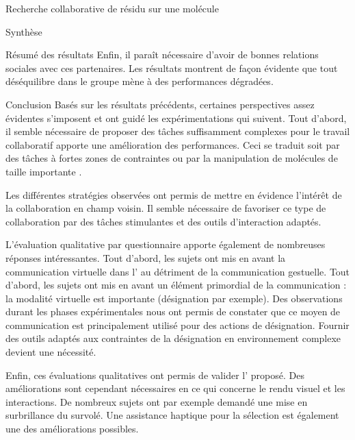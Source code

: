 \documentclass[myfrancais]{mythesis}
\begin{document}
\begin{mychapter}{Recherche collaborative de résidu sur une molécule}
\begin{mysection}{Synthèse}
\begin{mysubsection}{Résumé des résultats}
				Enfin, il paraît nécessaire d'avoir de bonnes relations sociales avec ces partenaires.
				Les résultats montrent de façon évidente que tout déséquilibre dans le groupe mène à des performances dégradées.
			\end{mysubsection}
			\begin{mysubsection}{Conclusion}
				Basés sur les résultats précédents, certaines perspectives assez évidentes s'imposent et ont guidé les expérimentations qui suivent.
				Tout d'abord, il semble nécessaire de proposer des tâches suffisamment complexes pour le travail collaboratif apporte une amélioration des performances.
				Ceci se traduit soit par des tâches à fortes zones de contraintes  ou par la manipulation de molécules de taille importante .

				Les différentes stratégies observées ont permis de mettre en évidence l'intérêt de la collaboration en champ voisin.
				Il semble nécessaire de favoriser ce type de collaboration par des tâches stimulantes et des outils d'interaction adaptés.

				L'évaluation qualitative par questionnaire apporte également de nombreuses réponses intéressantes.
				Tout d'abord, les sujets ont mis en avant la communication virtuelle dans l' au détriment de la communication gestuelle.
				Tout d'abord, les sujets ont mis en avant un élément primordial de la communication : la modalité virtuelle est importante (désignation par exemple).
				Des observations durant les phases expérimentales nous ont permis de constater que ce moyen de communication est principalement utilisé pour des actions de désignation.
				Fournir des outils adaptés aux contraintes de la désignation en environnement complexe devient une nécessité.

				Enfin, ces évaluations qualitatives ont permis de valider l' proposé.
				Des améliorations sont cependant nécessaires en ce qui concerne le rendu visuel et les interactions.
				De nombreux sujets ont par exemple demandé une mise en surbrillance du  survolé.
				Une assistance haptique pour la sélection est également une des améliorations possibles.
			\end{mysubsection}
		\end{mysection}
	\end{mychapter}
\end{document}
